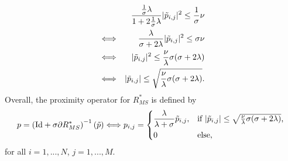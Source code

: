 \documentclass{scrreprt}
\begin{document}
                \begin{eqnarray}
                    &&\frac{\frac{1}{\sigma}\lambda}{1 + 2\frac{1}{\sigma}\lambda} |\tilde{p}_{i,j}|^{2} \le \frac{1}{\sigma} \nu \notag \\
                    &\Longleftrightarrow& \frac{\lambda}{\sigma + 2\lambda} |\tilde{p}_{i,j}|^{2} \le \sigma \nu \notag \\
                    &\Longleftrightarrow& |\tilde{p}_{i,j}|^{2} \le \frac{\nu}{\lambda}\sigma(\sigma + 2\lambda) \notag \\
                    &\Longleftrightarrow& |\tilde{p}_{i,j}| \le \sqrt{\frac{\nu}{\lambda}\sigma(\sigma + 2\lambda)}. \notag
                \end{eqnarray}
            Overall, the proximity operator for $R_{MS}^{\ast}$ is defined by
                \begin{equation}
                    p = \left( \textnormal{Id} + \sigma \partial R_{MS}^{\ast} \right)^{-1}(\tilde{p}) \Longleftrightarrow p_{i,j} =
                        \begin{dcases*}
                            \frac{\lambda}{\lambda + \sigma} \tilde{p}_{i,j}, & \textnormal{if $|\tilde{p}_{i,j}| \le \sqrt{\frac{\nu}{\lambda}\sigma(\sigma + 2\lambda)}$,} \\
                            0 & \textnormal{else,}
                        \end{dcases*}
                    \label{eq:proximity_operator_r_star}
                \end{equation}
            for all $i = 1, ..., N$, $j = 1, ..., M$.
\end{document}
